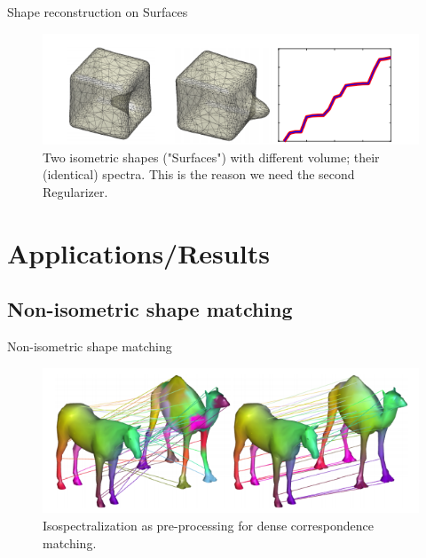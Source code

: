 \documentclass{beamer}
\begin{document}
\begin{frame}{Shape reconstruction on Surfaces}
\begin{figure}
 \includegraphics[width=\textwidth]{Surfaces}
 \caption{\label{fig:Surfaces} Two isometric shapes ("Surfaces") with different volume; their (identical) spectra. This is the reason we need the second Regularizer.}
\end{figure}
    
\end{frame}


    

\section{Applications/Results}


\subsection{Non-isometric shape matching}

\begin{frame}{Non-isometric shape matching}
    
\begin{figure}
 \includegraphics[width=\textwidth]{Correspondenses.png}
 \caption{\label{fig:Correspondenses} Isospectralization as pre-processing for dense correspondence matching.}
\end{figure}
    
    
\end{frame}
\end{document}
